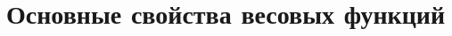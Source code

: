 \chapter{Основные свойства весовых функций}\label{app:А}


%	
%		
%
%	 	 	
%
% 
%
%	
%
%	
%	
% 
% 
% 	
% 	
% 	
% 
